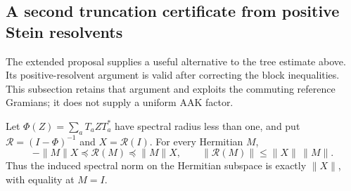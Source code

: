 \subsection{A second truncation certificate from positive Stein resolvents}
\label{I:U:sec:resolvent-truncation}
The extended proposal supplies a useful alternative to the tree estimate
above. Its positive-resolvent argument is valid after correcting the
block inequalities. This subsection retains that argument and exploits
the commuting reference Gramians; it does not supply a uniform AAK factor.

\begin{lemma}
\label{I:U:lem:positive-resolvent}
Let $\Phi(Z)=\sum_a T_aZT_a^*$ have spectral radius less than one,
and put $\mathcal R=(I-\Phi)^{-1}$ and $X=\mathcal R(I)$.
For every Hermitian $M$,
\[
 -\|M\|X\preceq\mathcal R(M)\preceq\|M\|X,
 \qquad \|\mathcal R(M)\|\le\|X\|\,\|M\|.
\]
Thus the induced spectral norm on the Hermitian subspace is exactly
$\|X\|$, with equality at $M=I$.
\end{lemma}


